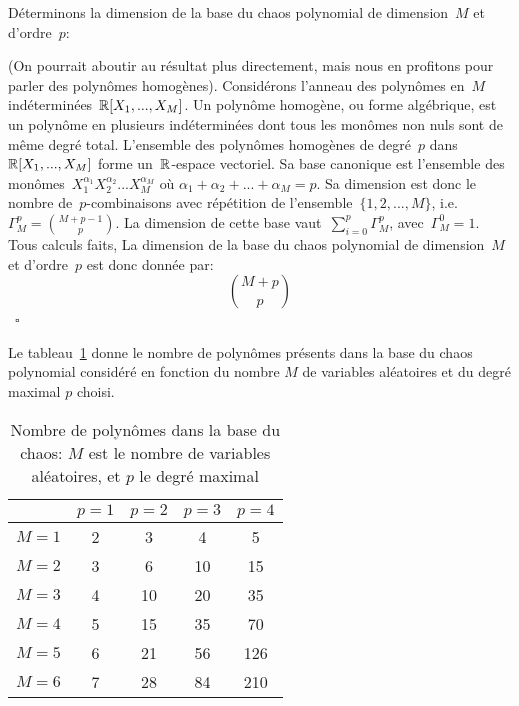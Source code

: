 \medskip
Déterminons la dimension de la base du chaos polynomial de dimension~$M$ et d'ordre~$p$:
\begin{demonstration}\footnotesize{}
(On pourrait aboutir au résultat plus directement, mais nous en profitons pour parler des polynômes homogènes). 
Considérons l'anneau des polynômes en~$M$ indéterminées~$\mathbb R[X_1, ..., X_M]$.
Un polynôme homogène, ou forme algébrique, est un polynôme en plusieurs indéterminées dont tous les monômes non nuls sont de même degré total. 
L'ensemble des polynômes homogènes de degré~$p$ dans~$\mathbb R[X_1, ..., X_M]$ forme un~$\mathbb R$-espace vectoriel. 
Sa base canonique est l'ensemble des monômes~$X_1^{\alpha_1}X_2^{\alpha_2}...X_M^{\alpha_M} \text{ où } \alpha_1+\alpha_2+...+\alpha_M=p$.
Sa dimension est donc le nombre de~$p$-combinaisons avec répétition de l'ensemble~$\{1, 2, ..., M\}$, i.e.~$\Gamma_M^p={M+p-1\choose p}$.
La dimension de cette base vaut~$\sum_{i=0}^p \Gamma_M^p$, avec~$\Gamma_M^0=1$.\normalsize{} \\
Tous calculs faits, La dimension de la base du chaos polynomial de dimension~$M$ et d'ordre~$p$ est donc donnée par:
\begin{equation}
{M+p\choose p}
\end{equation}\footnotesize{}~$\square$
\end{demonstration}
Le tableau~\ref{Tab-NbChaos} donne le nombre de polynômes présents dans la base du chaos polynomial considéré en fonction du nombre $M$ de variables aléatoires et du degré maximal $p$ choisi.
\begin{table}[htb]
\begin{center}
\begin{tabular}{c|cccc}
& $p=1$ & $p=2$ & $p=3$ & $p=4$\\
\hline
$M=1$ &2&3&4&5\\
$M=2$ &3&6&10&15\\
$M=3$ &4&10&20&35\\
$M=4$ &5&15&35&70\\
$M=5$ &6&21&56&126\\
$M=6$ &7&28&84&210
\end{tabular}
\end{center}
\caption{Nombre de polynômes dans la base du chaos: $M$ est le nombre de variables aléatoires, et $p$ le degré maximal}\label{Tab-NbChaos}
\end{table}



